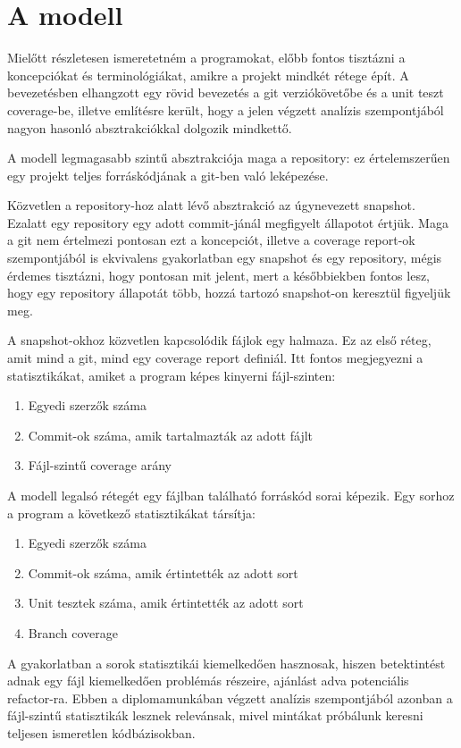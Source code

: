 \section{A modell}

Mielőtt részletesen ismeretetném a programokat, előbb fontos tisztázni a koncepciókat és terminológiákat, amikre a projekt mindkét rétege épít. A bevezetésben elhangzott egy rövid bevezetés a git verziókövetőbe és a unit teszt coverage-be, illetve említésre került, hogy a jelen végzett analízis szempontjából nagyon hasonló absztrakciókkal dolgozik mindkettő.

A modell legmagasabb szintű absztrakciója maga a repository: ez értelemszerűen egy projekt teljes forráskódjának a git-ben való leképezése.

Közvetlen a repository-hoz alatt lévő absztrakció az úgynevezett snapshot. Ezalatt egy repository egy adott commit-jánál megfigyelt állapotot értjük. Maga a git nem értelmezi pontosan ezt a koncepciót, illetve a coverage report-ok szempontjából is ekvivalens gyakorlatban egy snapshot és egy repository, mégis érdemes tisztázni, hogy pontosan mit jelent, mert a későbbiekben fontos lesz, hogy egy repository állapotát több, hozzá tartozó snapshot-on keresztül figyeljük meg.

A snapshot-okhoz közvetlen kapcsolódik fájlok egy halmaza. Ez az első réteg, amit mind a git, mind egy coverage report definiál. Itt fontos megjegyezni a statisztikákat, amiket a program képes kinyerni fájl-szinten:
\begin{enumerate}
    \item Egyedi szerzők száma
    \item Commit-ok száma, amik tartalmazták az adott fájlt
    \item Fájl-szintű coverage arány
\end{enumerate}

A modell legalsó rétegét egy fájlban található forráskód sorai képezik. Egy sorhoz a program a következő statisztikákat társítja:
\begin{enumerate}
    \item Egyedi szerzők száma
    \item Commit-ok száma, amik értintették az adott sort
    \item Unit tesztek száma, amik értintették az adott sort
    \item Branch coverage
\end{enumerate}

A gyakorlatban a sorok statisztikái kiemelkedően hasznosak, hiszen betektintést adnak egy fájl kiemelkedően problémás részeire, ajánlást adva potenciális refactor-ra. Ebben a diplomamunkában végzett analízis szempontjából azonban a fájl-szintű statisztikák lesznek relevánsak, mivel mintákat próbálunk keresni teljesen ismeretlen kódbázisokban.


